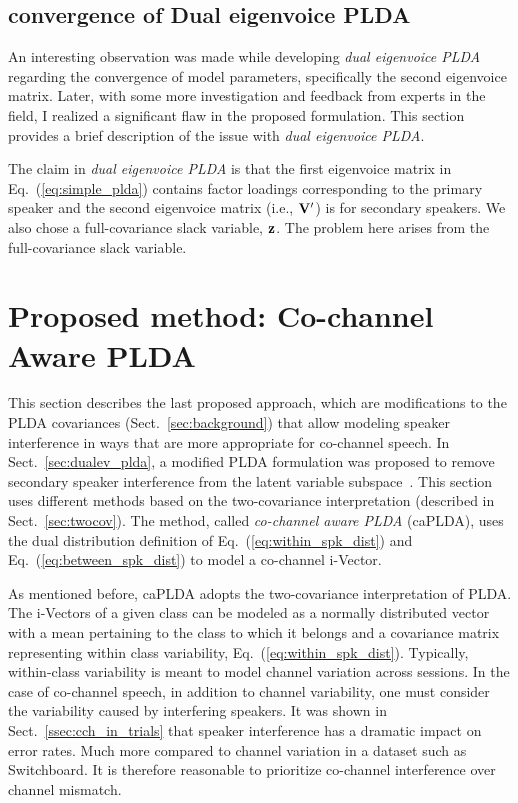 \newpage
\subsection{convergence of Dual eigenvoice PLDA}
\label{ssec:convergence_dualevplda}
An interesting observation was made while developing {\it dual eigenvoice PLDA} regarding the convergence of model parameters, specifically the second eigenvoice matrix. 
Later, with some more investigation and feedback from experts in the field, I realized a significant flaw in the proposed formulation. 
This section provides a brief description of the issue with {\it dual eigenvoice PLDA}. 

The claim in {\it dual eigenvoice PLDA} is that the first eigenvoice matrix in Eq.~(\ref{eq:simple_plda}) contains factor loadings corresponding to the primary speaker and the second eigenvoice matrix (i.e., ${\bf V}^\prime$) is for secondary speakers. 
We also chose a full-covariance slack variable, ${\bf z}$. 
The problem here arises from the full-covariance slack variable. 


\section{Proposed method: Co-channel Aware PLDA}
\label{sec:cch_plda}
This section describes the last proposed approach, which are modifications to the PLDA covariances (Sect.~\ref{sec:background}) that allow modeling speaker interference in ways that are more appropriate for co-channel speech. 
In Sect.~\ref{sec:dualev_plda}, a modified PLDA formulation was proposed to remove secondary speaker interference from the latent variable subspace~\cite{shokouhi2015}. 
This section uses different methods based on the two-covariance interpretation (described in Sect.~\ref{sec:twocov}). 
The method, called {\it co-channel aware PLDA} (caPLDA), uses the dual distribution definition of Eq.~(\ref{eq:within_spk_dist}) and Eq.~(\ref{eq:between_spk_dist}) to model a co-channel i-Vector. 

As mentioned before, caPLDA adopts the two-covariance interpretation of PLDA. 
The i-Vectors of a given class can be modeled as a normally distributed vector with a mean pertaining to the class to which it belongs and a covariance matrix representing within class variability, Eq.~(\ref{eq:within_spk_dist}). 
Typically, within-class variability is meant to model channel variation across sessions. 
In the case of co-channel speech, in addition to channel variability, one must consider the variability caused by interfering speakers. 
It was shown in Sect.~\ref{ssec:cch_in_trials} that speaker interference has a dramatic impact on error rates. Much more compared to channel variation in a dataset such as Switchboard. 
It is therefore reasonable to prioritize co-channel interference over channel mismatch. 

